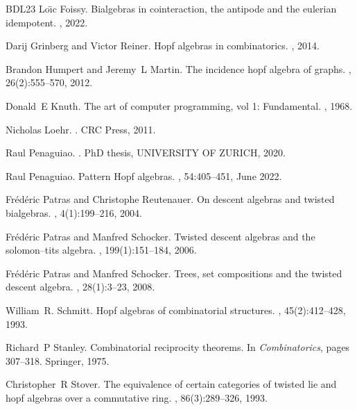 \documentclass[12pt, reqno]{amsart}
\theoremstyle{definition}
\begin{document}
\begin{thebibliography}{BDL{\etalchar{+}}23}
Lo{\"\i}c Foissy.
\newblock Bialgebras in cointeraction, the antipode and the eulerian
  idempotent.
, 2022.

Darij Grinberg and Victor Reiner.
\newblock Hopf algebras in combinatorics.
, 2014.

Brandon Humpert and Jeremy~L Martin.
\newblock The incidence hopf algebra of graphs.
, 26(2):555--570, 2012.

Donald~E Knuth.
\newblock The art of computer programming, vol 1: Fundamental.
, 1968.

Nicholas Loehr.
.
\newblock CRC Press, 2011.

Raul Penaguiao.
.
\newblock PhD thesis, UNIVERSITY OF ZURICH, 2020.

Raul Penaguiao.
\newblock Pattern {H}opf algebras.
, 54:405--451, June 2022.

Fr{\'e}d{\'e}ric Patras and Christophe Reutenauer.
\newblock On descent algebras and twisted bialgebras.
, 4(1):199--216, 2004.

Fr{\'e}d{\'e}ric Patras and Manfred Schocker.
\newblock Twisted descent algebras and the solomon--tits algebra.
, 199(1):151--184, 2006.

Fr{\'e}d{\'e}ric Patras and Manfred Schocker.
\newblock Trees, set compositions and the twisted descent algebra.
, 28(1):3--23, 2008.

William~R. Schmitt.
\newblock Hopf algebras of combinatorial structures.
, 45(2):412--428, 1993.

Richard~P Stanley.
\newblock Combinatorial reciprocity theorems.
\newblock In {\em Combinatorics}, pages 307--318. Springer, 1975.

Christopher~R Stover.
\newblock The equivalence of certain categories of twisted lie and hopf
  algebras over a commutative ring.
, 86(3):289--326, 1993.


\end{thebibliography}
\end{document}
